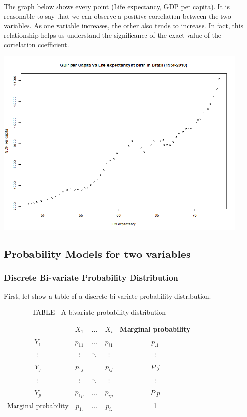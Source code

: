 \documentclass{article} %
\begin{document}
 


The graph below shows every point (Life expectancy, GDP per capita). It is reasonable to say that we can observe a positive correlation between the two variables. As one variable increases, the other also tends to increase. In fact, this relationship helps us understand the significance of the exact value of the correlation coefficient.

\includegraphics[width=0.95\textwidth]{tablesfolder/meu_grafico.png}

\subsection{Probability Models for two variables}

\subsubsection{Discrete Bi-variate Probability Distribution}
First, let show a table of a discrete bi-variate probability distribution.

\begin{table}[H]
\centering
\caption*{TABLE : A bivariate probability distribution}
\begin{tabular}{c|c|c|c|c}
 & \(X_1\) & \(\ldots\) & \(X_i\) & Marginal probability \\
\hline
\(Y_1\) & \(p_{11}\) & \(\ldots\) & \(p_{i1}\) & \(p_{.1}\) \\
\(\vdots\) & \(\vdots\) & \(\ddots\) & \(\vdots\) & \(\vdots\) \\
\(Y_j\) & \(p_{1j}\) & \(\ldots\) & \(p_{ij}\) & \(P_.j\) \\
\(\vdots\) & \(\vdots\) & \(\ddots\) & \(\vdots\) & \(\vdots\) \\
\(Y_p\) & \(p_{1p}\) & \(\ldots\) & \(p_{ip}\) & \(P_.p\) \\
\hline
Marginal probability & \(p_{1.}\) & \(\ldots\) & \(p_{i.}\) & 1
\end{tabular}
\end{table}
\end{document}
